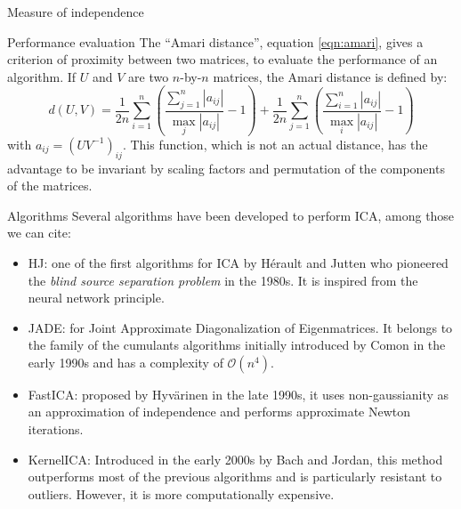 \documentclass{beamer}
\begin{document}
\begin{frame}{}
\begin{columns}[T]
\begin{column}{.48\linewidth}
\begin{block}{Measure of independence}
\end{block}


\begin{block}{Performance evaluation}
The ``Amari distance'', equation \ref{eqn:amari}, gives a criterion of proximity between two matrices, to evaluate the performance of an algorithm.
If $U$ and $V$ are two $n$-by-$n$ matrices, the Amari distance is defined by:
\begin{equation} \label{eqn:amari}
	d(U,V) = \frac{1}{2n}\sum\limits_{i=1}^n \left(\frac{\sum\limits_{j=1}^n|a_{ij}|}{\max_j |a_{ij}|}-1 \right)+\frac{1}{2n}\sum\limits_{j=1}^n \left(\frac{\sum\limits_{i=1}^n|a_{ij}|}{\max_i |a_{ij}|}-1 \right)
\end{equation}
with $a_{ij} = (UV^{-1})_{ij}$.
This function, which is not an actual distance, has the advantage to be invariant by scaling factors and permutation of the components of the matrices.

\end{block}


\begin{block}{Algorithms}
Several algorithms have been developed to perform ICA, among those we can cite:
\begin{itemize}
\item HJ: one of the first algorithms for ICA by Hérault and Jutten who pioneered the \textit{blind source separation problem} in the 1980s. It is inspired from the neural network principle.
\item JADE: for Joint Approximate Diagonalization of Eigenmatrices. It belongs to the family of the cumulants algorithms initially introduced by Comon in the early 1990s and has a complexity of $\mathcal{O}(n^4)$.
\item FastICA: proposed by Hyvärinen in the late 1990s, it uses non-gaussianity as an approximation of independence and performs approximate Newton iterations.
\item KernelICA: Introduced in the early 2000s by Bach and Jordan, this method outperforms most of the previous algorithms and is particularly resistant to outliers. However, it is more computationally expensive.
\end{itemize}

\end{block}


\end{column}
\end{columns}
\end{frame}
\end{document}
